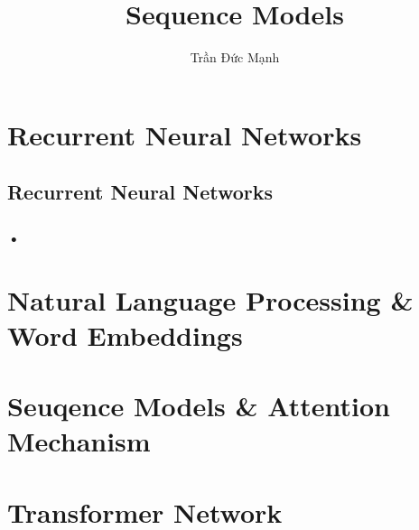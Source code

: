 \documentclass[12pt,a4paper]{report}
\author{Trần Đức Mạnh}
\title{Sequence Models}
\begin{document}
\maketitle
\tableofcontents

\chapter{Recurrent Neural Networks}
	\section{Recurrent Neural Networks}
		\subsection{•}
\chapter{Natural Language Processing \& Word Embeddings}
\chapter{Seuqence Models \& Attention Mechanism}
\chapter{Transformer Network}
\end{document}
